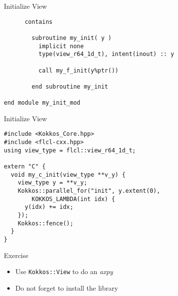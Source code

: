 \begin{frame}[containsverbatim]{Initialize View}
  \begin{verbatim}
      contains

        subroutine my_init( y )
          implicit none
          type(view_r64_1d_t), intent(inout) :: y

          call my_f_init(y%ptr())

        end subroutine my_init
  
end module my_init_mod
  \end{verbatim}
\end{frame}

\begin{frame}[containsverbatim]{Initialize View}
  \begin{verbatim}
#include <Kokkos_Core.hpp>
#include <flcl-cxx.hpp>
using view_type = flcl::view_r64_1d_t;

extern "C" {
  void my_c_init(view_type **v_y) {
    view_type y = **v_y;
    Kokkos::parallel_for("init", y.extent(0), 
        KOKKOS_LAMBDA(int idx) {
      y(idx) += idx;
    });
    Kokkos::fence();
  }
}
  \end{verbatim}
\end{frame}

\begin{frame}{Exercise}
  \begin{itemize}
    \item Use \texttt{Kokkos::View} to do an \emph{axpy}
    \item Do not forget to install the library
  \end{itemize}
\end{frame}


